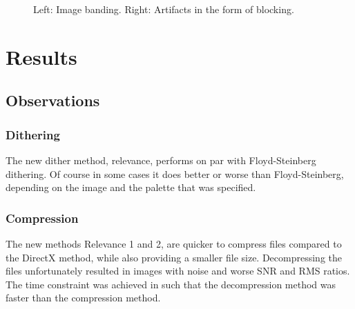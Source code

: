\documentclass[12pt]{CPP}
\begin{document}
\begin{figure}[!htbp]
\begin{center}
\end{center}
\caption{Left: Image banding. Right: Artifacts in the form of blocking.}
\end{figure}

\newpage
\section{Results}
\subsection{Observations}

\subsubsection{Dithering}
The new dither method, relevance, performs on par with Floyd-Steinberg dithering. Of course in some cases it does better or worse than Floyd-Steinberg, depending on the image and the palette that was specified.

\subsubsection{Compression}
The new methods Relevance 1 and 2, are quicker to compress files compared to the DirectX method, while also providing a smaller file size. Decompressing the files unfortunately resulted in images with noise and worse SNR and RMS ratios. The time constraint was achieved in such that the decompression method was faster than the compression method.
\end{document}
